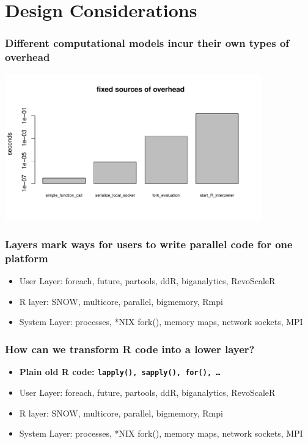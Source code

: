 \documentclass{beamer}
\begin{document}
\section{Design Considerations}
\begin{frame}

\frametitle{Different computational models incur their own types of overhead}

    \centerline{\includegraphics[height=2.5in]{../compute_times/overhead}}


\end{frame}
\begin{frame}

    \frametitle{Layers mark ways for users to write parallel code for one
    platform}

\begin{itemize}
\item User Layer: foreach, future, partools, ddR, biganalytics, RevoScaleR
\item R layer: SNOW, multicore, parallel, bigmemory, Rmpi
\item System Layer: processes, *NIX fork(), memory maps, network sockets,
    MPI
\end{itemize}

\end{frame}
\begin{frame}

    \frametitle{How can we transform R code into a lower layer?}

\begin{itemize}
    \item \textbf{Plain old R code: \texttt{lapply(), sapply(), for(), \dots}}
\item User Layer: foreach, future, partools, ddR, biganalytics, RevoScaleR
\item R layer: SNOW, multicore, parallel, bigmemory, Rmpi
\item System Layer: processes, *NIX fork(), memory maps, network sockets,
    MPI
\end{itemize}


\end{frame}
\end{document}
